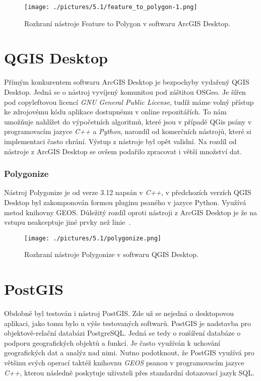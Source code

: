 \begin{figure}[h]
  \centering
  \texttt{[image: ./pictures/5.1/feature\_to\_polygon-1.png]}
  \caption{Rozhraní nástroje Feature to Polygon v softwaru ArcGIS Desktop.}
  \label{fig:feature_to_polygon-1}
\end{figure}


\section{QGIS Desktop}
	Přímým konkurentem softwaru ArcGIS Desktop je bezpochyby vydařený QGIS Desktop. Jedná se o nástroj vyvíjený komunitou pod záštitou OSGeo. Je šířen pod copyleftovou  licencí \textit{GNU General Public License}, tudíž máme volný přístup ke zdrojovému kódu aplikace dostupnému v online repozitářích. To nám umožňuje nahlížet do výpočetních algoritmů, které jsou v případě QGis psány v programovacím jazyce \textit{C++} a \textit{Python}, narozdíl od komerčních nástrojů, které si implementaci často chrání. Výstup z nástroje byl opět validní. Na rozdíl od nástroje z ArcGIS Desktop se ovšem podařilo zpracovat i větší množství dat.

\subsubsection{Polygonize}
Nástroj Polygonize je od verze 3.12 napsán v \textit{C++}, v předchozích verzích QGIS Desktop byl zakomponován formou pluginu psaného v jazyce Python. Využívá metod knihovny GEOS. Důležitý rozdíl oproti nástroji z ArcGIS Desktop je že na vstupu neakceptuje jiné prvky než linie~\cite{QGIS_software}.

\begin{figure}[h]
  \centering
  \texttt{[image: ./pictures/5.1/polygonize.png]}
  \caption{Rozhraní nástroje Polygonize v softwaru QGIS Desktop.}
  \label{fig:polygonize}
\end{figure}

\section{PostGIS}
	Obdobně byl testován i nástroj PostGIS. Zde už se nejedná o desktopovou aplikaci, jako tomu bylo u výše testovaných softwarů. PostGIS je nadstavba pro objektově-relační databázi PostgreSQL. Jedná se tedy o rozšíření databáze o podporu geo\-grafických objektů a funkcí. Je často využíván k uchování geografických dat a analýz nad nimi. Nutno podotknout, že PostGIS využívá pro většinu svých o\-pe\-ra\-cí taktéž knihovnu \textit{GEOS} psanou v programovacím jazyce \textit{C++}, kterou následně poskytuje uživateli přes standardní dotazovací jazyk SQL.
	
